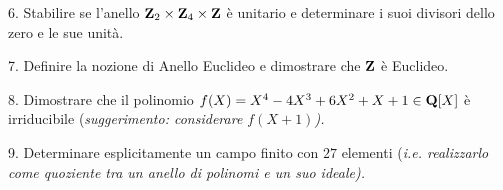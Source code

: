 \item{6.} Stabilire se l'anello ${\bf Z}_2\times{\bf Z}_4\times{\bf Z}$ \`e unitario e determinare i suoi divisori 
dello zero e le sue unit\`a.
\vv

\item{7.} Definire la nozione di Anello Euclideo e dimostrare che ${\bf Z}$ \`e Euclideo.
\ve \vs

\item{8.} Dimostrare che il polinomio $f(X)=X^4 - 4X^3 + 6X^2 + X + 1\in{\bf Q}[X]$ \`e irriducibile (\it suggerimento:
considerare $f(X+1)$\rm).
\vv\vv

\item{9.} Determinare esplicitamente un campo finito con $27$ elementi (\it i.e. realizzarlo come quoziente tra un anello di
polinomi e un suo ideale\rm ).
\ \vst

 \bye

